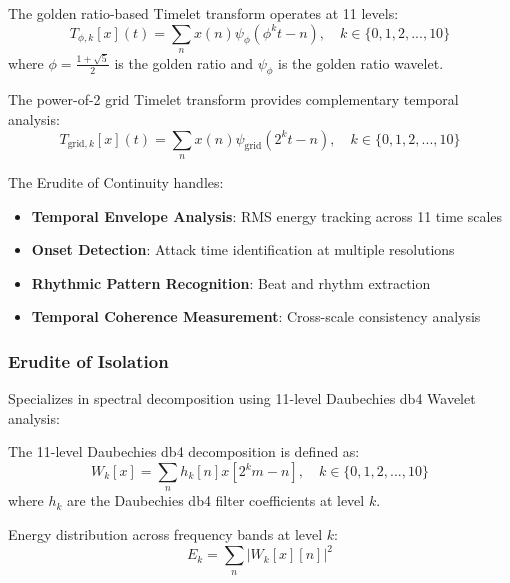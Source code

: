 \begin{definition}
The golden ratio-based Timelet transform operates at 11 levels:
\begin{equation}
T_{\phi,k}[x](t) = \sum_{n} x(n) \psi_{\phi}(\phi^k t - n), \quad k \in \{0,1,2,...,10\}
\end{equation}
where $\phi = \frac{1+\sqrt{5}}{2}$ is the golden ratio and $\psi_{\phi}$ is the golden ratio wavelet.
\end{definition}

\begin{definition}
The power-of-2 grid Timelet transform provides complementary temporal analysis:
\begin{equation}
T_{\text{grid},k}[x](t) = \sum_{n} x(n) \psi_{\text{grid}}(2^k t - n), \quad k \in \{0,1,2,...,10\}
\end{equation}
\end{definition}

The Erudite of Continuity handles:
\begin{itemize}
    \item \textbf{Temporal Envelope Analysis}: RMS energy tracking across 11 time scales
    \item \textbf{Onset Detection}: Attack time identification at multiple resolutions
    \item \textbf{Rhythmic Pattern Recognition}: Beat and rhythm extraction
    \item \textbf{Temporal Coherence Measurement}: Cross-scale consistency analysis
\end{itemize}

\subsubsection{Erudite of Isolation}
Specializes in spectral decomposition using 11-level Daubechies db4 Wavelet analysis:

\begin{definition}
The 11-level Daubechies db4 decomposition is defined as:
\begin{equation}
W_{k}[x] = \sum_{n} h_k[n] x[2^k m - n], \quad k \in \{0,1,2,...,10\}
\end{equation}
where $h_k$ are the Daubechies db4 filter coefficients at level $k$.
\end{definition}

\begin{definition}
Energy distribution across frequency bands at level $k$:
\begin{equation}
E_k = \sum_{n} |W_k[x][n]|^2
\end{equation}
\end{definition}

